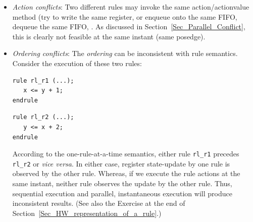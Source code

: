 \begin{itemize}

 \item \emph{Action conflicts}: Two different rules may invoke the
       same action/actionvalue method (try to write the same register,
       or enqueue onto the same FIFO, dequeue the same FIFO, {\etc}.
       As discussed in Section~\ref{Sec_Parallel_Conflict}, this is
       clearly not feasible at the same instant (same posedge).

 \item \emph{Ordering conflicts}: The \emph{ordering} can be
       inconsistent with rule semantics.  Consider the execution of
       these two rules:

       \begin{center}
       \begin{minipage}{2.5in}
        {\small
        \begin{Verbatim}[frame=single, label=BSV]
rule rl_r1 (...);
   x <= y + 1;
endrule
        \end{Verbatim}
        }
       \end{minipage}
       \hmm
       \begin{minipage}{2.5in}
        {\small
        \begin{Verbatim}[frame=single,label=BSV]
rule rl_r2 (...);
   y <= x + 2;
endrule
        \end{Verbatim}
        }
       \end{minipage}
       \end{center}

       According to the one-rule-at-a-time semantics, either rule
       \verb|rl_r1| precedes \verb|rl_r2| or \emph{vice versa}.  In
       either case, register state-update by one rule is observed by
       the other rule.  Whereas, if we execute the rule actions at the
       same instant, neither rule observes the update by the other
       rule.  Thus, sequential execution and parallel, instantaneous
       execution will produce inconsistent results. (See also the
       Exercise at the end of
       Section~\ref{Sec_HW_representation_of_a_rule}.)

\end{itemize}

